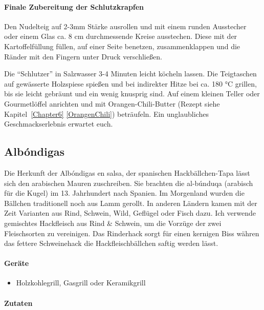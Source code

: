 \paragraph{Finale Zubereitung der Schlutzkrapfen}

Den Nudelteig auf 2-3mm Stärke ausrollen und mit einem runden Ausstecher oder einem Glas ca. 8 cm durchmessende Kreise 
ausstechen. Diese mit der Kartoffelfüllung füllen, auf einer Seite benetzen, zusammenklappen und die Ränder mit den Fingern unter 
Druck verschließen.

Die "`Schlutzer"' in Salzwasser 3-4 Minuten leicht köcheln lassen. Die Teigtaschen auf gewässerte Holzspiese spießen und bei 
indirekter Hitze bei ca. 180 °C grillen, bis sie leicht gebräunt und ein wenig knusprig sind. Auf einem kleinen Teller oder Gourmetlöffel 
anrichten und mit Orangen-Chili-Butter (Rezept siehe 
Kapitel~\ref{Chapter6} \vref{OrangenChili}) beträufeln. Ein unglaubliches Geschmackserlebnis erwartet euch.

\subsection{Albóndigas}

Die Herkunft der Albóndigas en salsa, der spanischen Hackbällchen-Tapa lässt sich den arabischen Mauren zuschreiben. Sie brachten 
die al-búnduqa (arabisch für die Kugel) im 13. Jahrhundert nach Spanien. Im Morgenland wurden die Bällchen traditionell noch aus Lamm 
gerollt. In anderen Ländern kamen mit der Zeit Varianten aus Rind, Schwein, Wild, Geflügel oder Fisch dazu. Ich verwende gemischtes 
Hackfleisch aus Rind \& Schwein, um die Vorzüge der zwei Fleischsorten zu vereinigen. Das Rinderhack sorgt für einen kernigen Biss 
währen das fettere Schweinehack die Hackfleischbällchen saftig werden lässt.

\paragraph{Geräte}

\begin{itemize}[noitemsep]
	\item Holzkohlegrill, Gasgrill oder Keramikgrill
\end{itemize}

\paragraph{Zutaten}

